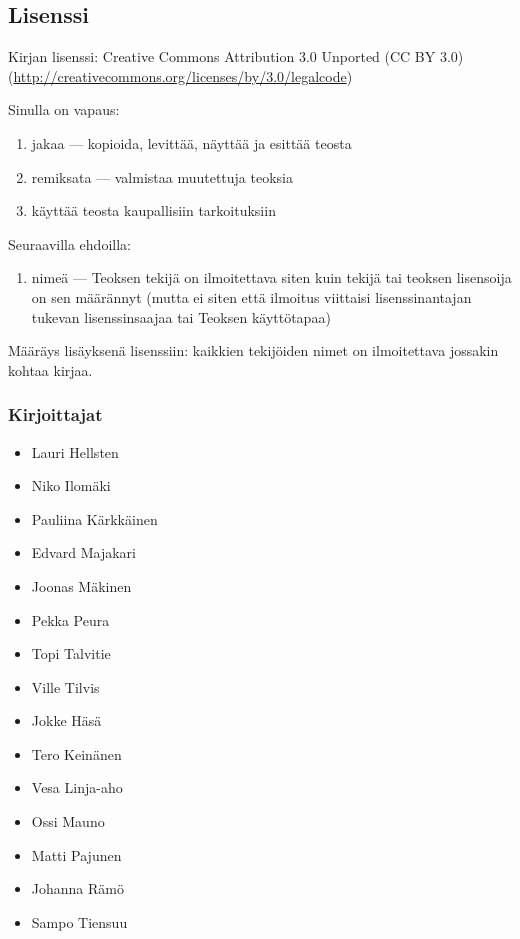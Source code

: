 \newpage
\subsection*{Lisenssi}

Kirjan lisenssi: Creative Commons Attribution 3.0 Unported (CC BY 3.0) \\
(\url{http://creativecommons.org/licenses/by/3.0/legalcode})

Sinulla on vapaus:
\begin{enumerate}
\item jakaa — kopioida, levittää, näyttää ja esittää teosta
\item remiksata — valmistaa muutettuja teoksia
\item käyttää teosta kaupallisiin tarkoituksiin
\end{enumerate}
Seuraavilla ehdoilla:
\begin{enumerate}
\item nimeä — Teoksen tekijä on ilmoitettava siten kuin tekijä tai teoksen lisensoija on sen määrännyt (mutta ei siten että ilmoitus viittaisi lisenssinantajan tukevan lisenssinsaajaa tai Teoksen käyttötapaa)
\end{enumerate}

Määräys lisäyksenä lisenssiin: kaikkien tekijöiden nimet on ilmoitettava jossakin kohtaa kirjaa.

\subsubsection*{Kirjoittajat}
\begin{minipage}[t]{0.5\textwidth}
\begin{itemize}
\item Lauri Hellsten
\item Niko Ilomäki
\item Pauliina Kärkkäinen
\item Edvard Majakari
\item Joonas Mäkinen
\item Pekka Peura
\item Topi Talvitie
\item Ville Tilvis
\end{itemize}
\end{minipage}
\begin{minipage}[t]{0.5\textwidth}
\begin{itemize}
\item Jokke Häsä
\item Tero Keinänen
\item Vesa Linja-aho
\item Ossi Mauno
\item Matti Pajunen
\item Johanna Rämö
\item Sampo Tiensuu
\end{itemize}
\end{minipage} \\
\\
\\
\\

